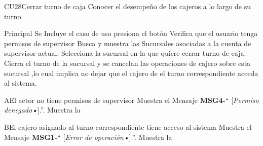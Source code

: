 \begin{UseCase}{CU28}{Cerrar turno de caja}{
	Conocer el desempeño de los cajeros a lo largo de su turno.
	}
	\end{UseCase}
	\begin{UCtrayectoria}{Principal}
		\UCpaso Se Incluye el caso de uso 
		\UCpaso presiona el botón 
		\UCpaso Verifica que el usuario tenga permisos de supervisor  
		\UCpaso Busca y muestra las Sucursales asociadas a la cuenta de supervisor actual.
		\UCpaso [\UCactor] Selecciona la sucursal en la que quiere cerrar turno de caja.
		\UCpaso Cierra el turno de la sucursal y se cancelan las operaciones de cajero sobre esta sucursal ,lo cual implica no dejar que el cajero de el turno correspondiente acceda al sistema. 
	\end{UCtrayectoria}

\begin{UCtrayectoriaA}{A}{El actor no tiene permisos de supervisor}
	\UCpaso Muestra el Mensaje {\bf MSG4-}`` [{\em Permiso denegado\textsl{•}}].''.
			\UCpaso Muestra la 
\end{UCtrayectoriaA}
\begin{UCtrayectoriaA}{B}{El cajero asignado al turno correspondiente tiene acceso al sistema}
	\UCpaso Muestra el Mensaje {\bf MSG1-}`` [{\em Error de operación\textsl{•}}].''.
			\UCpaso Muestra la 
\end{UCtrayectoriaA}